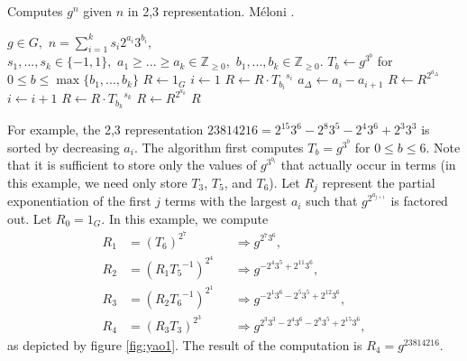 \documentclass{ucalgthes1}
\theoremstyle{plain}
\theoremstyle{definition}
\newcommand{\ZZgez}{\mathbb{Z}_{\ge 0}}
\begin{document}
\begin{algorithm}[h]
\caption{Computes $g^n$ given $n$ in 2,3 representation. M\'{e}loni \cite[Section 3.2]{Meloni2009}.}
\label{alg:yaos}
\begin{algorithmic}[1]
\REQUIRE $g \in G,$ 
$n = \sum_{i=1}^k s_i2^{a_i}3^{b_i},$ \\
$s_1,...,s_k \in \{-1, 1\},$ 
$a_1 \ge ... \ge a_k \in \ZZgez,$ 
$b_1,...,b_k \in \ZZgez.$
\STATE $T_b \gets g^{3^b}$ for $0 \le b \le \max \{ b_1, ..., b_k \}$ 
\STATE $R \gets 1_G$
\STATE $i \gets 1$
	\STATE $R \gets R \cdot {T_{b_i}}^{s_i}$ 
	\STATE $a_\Delta \gets a_i - a_{i+1}$
	\STATE $R \gets R ^ {2^{a_\Delta}}$ 
	\STATE $i \gets i + 1$
\ENDWHILE
\STATE $R \gets R \cdot {T_{b_k}}^{s_k}$
\STATE $R \gets R ^ {2^{a_k}}$ 
\RETURN $R$
\end{algorithmic}
\end{algorithm}

For example, the 2,3 representation $23814216 = 2^{15} 3^6 - 2^8 3^5 - 2^4 3^6 + 2^3 3^3$ is sorted by decreasing $a_i$.  The algorithm first computes $T_b = g^{3^b}$ for $0 \le b \le 6$.  Note that it is sufficient to store only the values of $g^{3^{b_i}}$ that actually occur in terms (in this example, we need only store $T_3$, $T_5$, and $T_6$).  Let $R_j$ represent the partial exponentiation of the first $j$ terms with the largest $a_i$ such that $g^{2^{a_{j+1}}}$ is factored out.  Let $R_0 = 1_G$.  In this example, we compute 
\begin{align*}
	R_1 &= \left( T_6 \right)^{2^7} &&\Rightarrow g^{2^7 3^6}, \\
	R_2 &= \left( R_1 {T_5}^{-1} \right)^{2^4} &&\Rightarrow g^{-2^4 3^5 + 2^{11} 3^6}, \\
	R_3 &= \left( R_2 {T_6}^{-1} \right)^{2^1} &&\Rightarrow g^{-2^1 3^6 -2^5 3^5 + 2^{12} 3^6}, \\
	R_4 &= \left( R_3 T_3 \right) ^ {2^3} &&\Rightarrow g^{2^3 3^3 -2^4 3^6 -2^8 3^5 + 2^{15} 3^6},
\end{align*}
as depicted by figure \ref{fig:yao1}.  The result of the computation is $R_4 = g^{23814216}$.  
\end{document}
